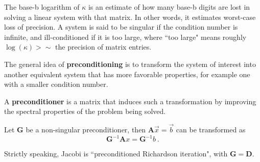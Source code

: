 \documentclass[12pt]{article}
\newcommand{\ve}[1]{\ensuremath{\mathbf{#1}}}
\begin{document}
The base-b logarithm of $\kappa$ is an estimate of how many base-b digits are lost in solving a linear system with that matrix. In other words, it estimates worst-case loss of precision. A system is said to be singular if the condition number is infinite, and ill-conditioned if it is too large, where ``too large" means roughly $\log(\kappa) >\sim$ the precision of matrix entries. %

The general idea of \textbf{preconditioning} is to transform the system of interest into another equivalent system that has more favorable properties, for example one with a smaller condition number. 

A \textbf{preconditioner} is a matrix that induces such a transformation by improving the spectral properties of the problem being solved. 

Let $\ve{G}$ be a non-singular preconditioner, then \cite{Benzi2002} $\ve{A}\vec{x}=\vec{b}$ can be transformed as 
\[ \ve{G}^{-1}\ve{A}x = \ve{G}^{-1}b \:.\] 

Strictly speaking, Jacobi is ``preconditioned Richardson iteration", with $\ve{G} = \ve{D}$.
%

\end{document}
